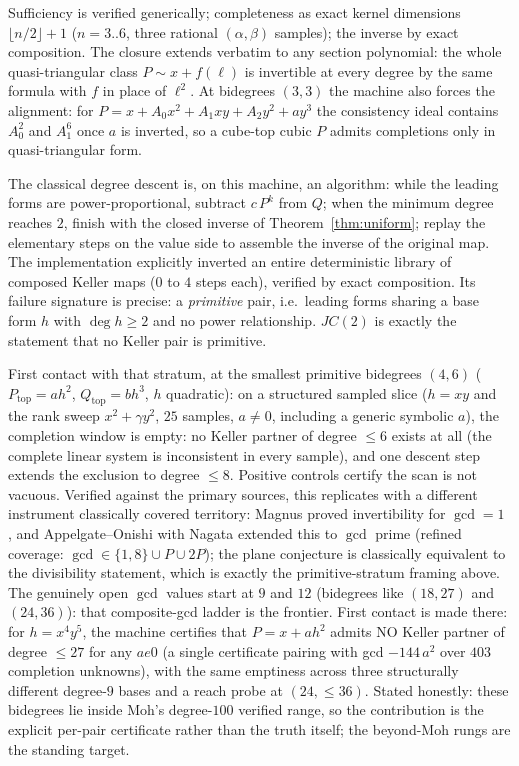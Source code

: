 \documentclass[11pt]{article}
\theoremstyle{definition}
\theoremstyle{remark}
\begin{document}
Sufficiency is verified generically; completeness as exact kernel dimensions
$\lfloor n/2 \rfloor + 1$ ($n = 3..6$, three rational $(\alpha, \beta)$ samples); the inverse
by exact composition. The closure extends verbatim to any section polynomial: the whole
quasi-triangular class $P \sim x + f(\ell)$ is invertible at every degree by the same formula
with $f$ in place of $\ell^2$. At bidegrees $(3,3)$ the machine also forces the alignment: for
$P = x + A_0 x^2 + A_1 xy + A_2 y^2 + a y^3$ the consistency ideal contains $A_0^2$ and
$A_1^6$ once $a$ is inverted, so a cube-top cubic $P$ admits completions only in
quasi-triangular form.

The classical degree descent is, on this machine, an algorithm: while the leading forms are
power-proportional, subtract $c\,P^k$ from $Q$; when the minimum degree reaches $2$, finish
with the closed inverse of Theorem~\ref{thm:uniform}; replay the elementary steps on the value
side to assemble the inverse of the original map. The implementation explicitly inverted an
entire deterministic library of composed Keller maps ($0$ to $4$ steps each), verified by
exact composition. Its failure signature is precise: a \emph{primitive} pair, i.e.\ leading
forms sharing a base form $h$ with $\deg h \ge 2$ and no power relationship. $JC(2)$ is
exactly the statement that no Keller pair is primitive.

First contact with that stratum, at the smallest primitive bidegrees $(4,6)$
($P_{\mathrm{top}} = a h^2$, $Q_{\mathrm{top}} = b h^3$, $h$ quadratic): on a structured
sampled slice ($h = xy$ and the rank sweep $x^2 + \gamma y^2$, $25$ samples, $a \ne 0$,
including a generic symbolic $a$), the completion window is empty: no Keller partner of degree
$\le 6$ exists at all (the complete linear system is inconsistent in every sample), and one
descent step extends the exclusion to degree $\le 8$. Positive controls certify the scan is
not vacuous. Verified against the primary sources, this replicates with a different
instrument classically covered territory: Magnus proved invertibility for $\gcd = 1$
\cite{Magnus1954}, and Appelgate--Onishi \cite{AppelgateOnishi1985} with Nagata extended
this to $\gcd$ prime (refined coverage: $\gcd \in \{1, 8\} \cup P \cup 2P$); the plane
conjecture is classically equivalent to the divisibility statement, which is exactly the
primitive-stratum framing above. The genuinely open $\gcd$ values start at $9$ and $12$
(bidegrees like $(18,27)$ and $(24,36)$): that composite-gcd ladder is the frontier. First
contact is made there: for $h = x^4 y^5$, the machine certifies that $P = x + a h^2$ admits
NO Keller partner of degree $\le 27$ for any $a 
e 0$ (a single certificate pairing with
gcd $-144\,a^2$ over $403$ completion unknowns), with the same emptiness across three
structurally different degree-$9$ bases and a reach probe at $(24, \le 36)$. Stated
honestly: these bidegrees lie inside Moh's degree-$100$ verified range, so the contribution
is the explicit per-pair certificate rather than the truth itself; the beyond-Moh rungs are
the standing target.
\end{document}
